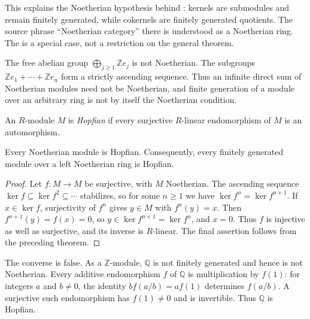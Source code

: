 This explains the Noetherian hypothesis behind : kernels are submodules and remain finitely generated, while cokernels are finitely generated quotients. The source phrase ``Noetherian category'' there is understood as a Noetherian ring. The  is a special case, not a restriction on the general theorem.

\begin{example}\label{ex-infinite-sum-not-noetherian}
The free abelian group $\bigoplus_{j\ge1}\mathbb Z e_j$ is not Noetherian. The subgroups $\mathbb Ze_1+\cdots+\mathbb Ze_n$ form a strictly ascending sequence. Thus an infinite direct sum of Noetherian modules need not be Noetherian, and finite generation of a module over an arbitrary ring is not by itself the Noetherian condition.
\end{example}

\begin{definition}\label{def-hopfian-module}
An $R$-module $M$ is \emph{Hopfian} if every surjective $R$-linear endomorphism of $M$ is an automorphism.
\end{definition}

\begin{theorem}\label{thm-noetherian-hopfian}
Every Noetherian module is Hopfian. Consequently, every finitely generated module over a left Noetherian ring is Hopfian.
\end{theorem}
\begin{proof}\label{proof-noetherian-hopfian}
Let $f:M\to M$ be surjective, with $M$ Noetherian. The ascending sequence $\ker f\subseteq\ker f^2\subseteq\cdots$ stabilizes, so for some $n\ge1$ we have $\ker f^n=\ker f^{n+1}$. If $x\in\ker f$, surjectivity of $f^n$ gives $y\in M$ with $f^n(y)=x$. Then $f^{n+1}(y)=f(x)=0$, so $y\in\ker f^{n+1}=\ker f^n$, and $x=0$. Thus $f$ is injective as well as surjective, and its inverse is $R$-linear. The final assertion follows from the preceding theorem.
\end{proof}

\begin{remark}\label{remark-hopfian-not-noetherian}
The converse is false. As a $\mathbb Z$-module, $\mathbb Q$ is not finitely generated and hence is not Noetherian. Every additive endomorphism $f$ of $\mathbb Q$ is multiplication by $f(1)$: for integers $a$ and $b\ne0$, the identity $b f(a/b)=a f(1)$ determines $f(a/b)$. A surjective such endomorphism has $f(1)\ne0$ and is invertible. Thus $\mathbb Q$ is Hopfian.
\end{remark}

